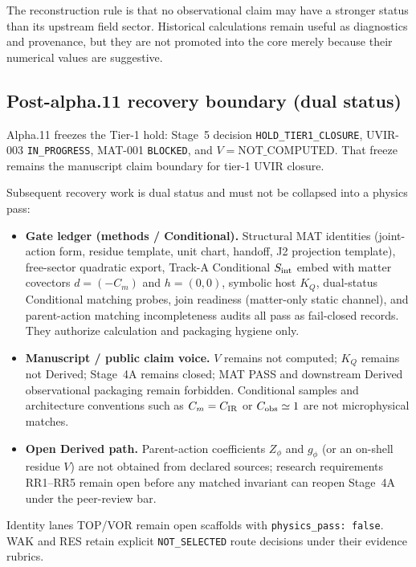 The reconstruction rule is that no observational claim may have a stronger
status than its upstream field sector.  Historical calculations remain useful
as diagnostics and provenance, but they are not promoted into the core merely
because their numerical values are suggestive.

\subsection{Post-alpha.11 recovery boundary (dual status)}

Alpha.11 freezes the Tier-1 hold: Stage~5 decision
\texttt{HOLD\_TIER1\_CLOSURE}, UVIR-003 \texttt{IN\_PROGRESS}, MAT-001
\texttt{BLOCKED}, and $V=\mathrm{NOT\_COMPUTED}$.  That freeze remains the
manuscript claim boundary for tier-1 UVIR closure.

Subsequent recovery work is dual status and must not be collapsed into a
physics pass:

\begin{itemize}
\item \textbf{Gate ledger (methods / Conditional).}
 Structural MAT identities
  (joint-action form, residue template, unit chart, handoff, J2 projection
  template), free-sector quadratic export, Track-A Conditional $S_{\rm int}$
  embed with matter covectors $d=(-C_m)$ and $h=(0,0)$, symbolic host $K_Q$,
  dual-status Conditional matching probes, join readiness (matter-only static
  channel), and parent-action matching incompleteness audits all pass as
  fail-closed records.  They authorize calculation and packaging hygiene only.
\item \textbf{Manuscript / public claim voice.} $V$ remains not computed;
  $K_Q$ remains not Derived; Stage~4A remains closed; MAT PASS and downstream
  Derived observational packaging remain forbidden.  Conditional samples and
  architecture conventions such as $C_m=C_{\rm IR}$ or $C_{\rm obs}\simeq 1$
  are not microphysical matches.
\item \textbf{Open Derived path.} Parent-action coefficients $Z_\phi$ and
  $g_\phi$ (or an on-shell residue $V$) are not obtained from declared
  sources; research requirements RR1--RR5 remain open before any matched
  invariant can reopen Stage~4A under the peer-review bar.
\end{itemize}

Identity lanes TOP/VOR remain open scaffolds with
\texttt{physics\_pass: false}.  WAK and RES retain explicit
\texttt{NOT\_SELECTED} route decisions under their evidence rubrics.
